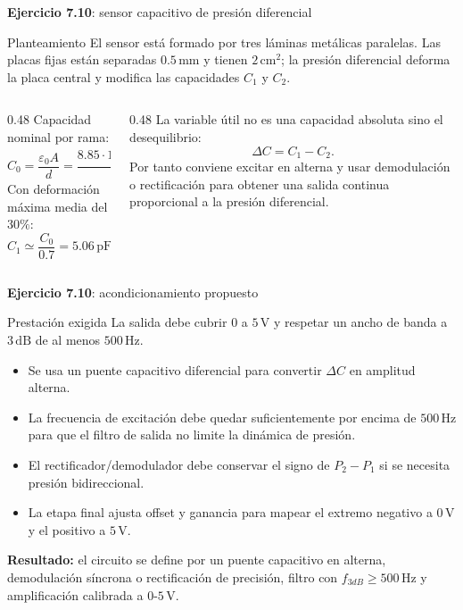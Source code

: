 \documentclass[aspectratio=169,9pt]{beamer}
\newcommand{\exercise}[1]{\textbf{Ejercicio #1}}
\newcommand{\result}[1]{\textbf{\color{eiTeal}Resultado:} #1}
\newcommand{\unit}[1]{\,\mathrm{#1}}
\begin{document}
\begin{frame}{\exercise{7.10}: sensor capacitivo de presión diferencial}
  \begin{block}{Planteamiento}
    El sensor está formado por tres láminas metálicas paralelas. Las placas fijas están separadas \(0.5\unit{mm}\) y tienen \(2\unit{cm^2}\); la presión diferencial deforma la placa central y modifica las capacidades \(C_1\) y \(C_2\).
  \end{block}

  \begin{columns}[T,onlytextwidth]
    \begin{column}{0.48\textwidth}
      Capacidad nominal por rama:
      \[
        C_0=\frac{\varepsilon_0 A}{d}
        =\frac{8.85\cdot10^{-12}(2\cdot10^{-4})}{0.5\cdot10^{-3}}
        \simeq 3.54\unit{pF}.
      \]
      Con deformación máxima media del \(30\%\):
      \[
        C_1\simeq\frac{C_0}{0.7}=5.06\unit{pF},
        \qquad
        C_2\simeq\frac{C_0}{1.3}=2.72\unit{pF}.
      \]
    \end{column}
    \begin{column}{0.48\textwidth}
      La variable útil no es una capacidad absoluta sino el desequilibrio:
      \[
        \Delta C=C_1-C_2 .
      \]
      Por tanto conviene excitar en alterna y usar demodulación o rectificación para obtener una salida continua proporcional a la presión diferencial.
    \end{column}
  \end{columns}
\end{frame}

\begin{frame}{\exercise{7.10}: acondicionamiento propuesto}
  \begin{block}{Prestación exigida}
    La salida debe cubrir \(0\) a \(5\unit{V}\) y respetar un ancho de banda a \(3\unit{dB}\) de al menos \(500\unit{Hz}\).
  \end{block}

  \begin{itemize}
    \item Se usa un puente capacitivo diferencial para convertir \(\Delta C\) en amplitud alterna.
    \item La frecuencia de excitación debe quedar suficientemente por encima de \(500\unit{Hz}\) para que el filtro de salida no limite la dinámica de presión.
    \item El rectificador/demodulador debe conservar el signo de \(P_2-P_1\) si se necesita presión bidireccional.
    \item La etapa final ajusta offset y ganancia para mapear el extremo negativo a \(0\unit{V}\) y el positivo a \(5\unit{V}\).
  \end{itemize}

  \result{el circuito se define por un puente capacitivo en alterna, demodulación síncrona o rectificación de precisión, filtro con \(f_{3dB}\ge500\unit{Hz}\) y amplificación calibrada a \(0\)-\(5\unit{V}\).}
\end{frame}
\end{document}
